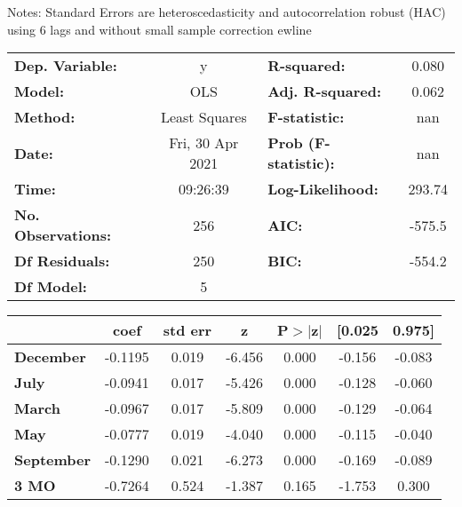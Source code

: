 Notes: \newline
 [1] Standard Errors are heteroscedasticity and autocorrelation robust (HAC) using 6 lags and without small sample correction
ewline\begin{center}
\begin{tabular}{lclc}
\toprule
\textbf{Dep. Variable:}    &        y         & \textbf{  R-squared:         } &     0.080   \\
\textbf{Model:}            &       OLS        & \textbf{  Adj. R-squared:    } &     0.062   \\
\textbf{Method:}           &  Least Squares   & \textbf{  F-statistic:       } &       nan   \\
\textbf{Date:}             & Fri, 30 Apr 2021 & \textbf{  Prob (F-statistic):} &      nan    \\
\textbf{Time:}             &     09:26:39     & \textbf{  Log-Likelihood:    } &    293.74   \\
\textbf{No. Observations:} &         256      & \textbf{  AIC:               } &    -575.5   \\
\textbf{Df Residuals:}     &         250      & \textbf{  BIC:               } &    -554.2   \\
\textbf{Df Model:}         &           5      & \textbf{                     } &             \\
\bottomrule
\end{tabular}
\begin{tabular}{lcccccc}
                   & \textbf{coef} & \textbf{std err} & \textbf{z} & \textbf{P$> |$z$|$} & \textbf{[0.025} & \textbf{0.975]}  \\
\midrule
\textbf{December}  &      -0.1195  &        0.019     &    -6.456  &         0.000        &       -0.156    &       -0.083     \\
\textbf{July}      &      -0.0941  &        0.017     &    -5.426  &         0.000        &       -0.128    &       -0.060     \\
\textbf{March}     &      -0.0967  &        0.017     &    -5.809  &         0.000        &       -0.129    &       -0.064     \\
\textbf{May}       &      -0.0777  &        0.019     &    -4.040  &         0.000        &       -0.115    &       -0.040     \\
\textbf{September} &      -0.1290  &        0.021     &    -6.273  &         0.000        &       -0.169    &       -0.089     \\
\textbf{3 MO}      &      -0.7264  &        0.524     &    -1.387  &         0.165        &       -1.753    &        0.300     \\

\end{tabular}
\end{center}
